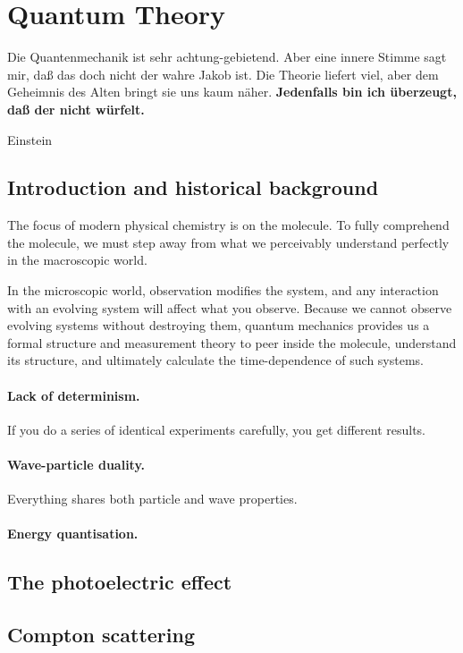 \documentclass{article}
\numberwithin{theorem}{section}
\numberwithin{corollary}{section}
\numberwithin{postulate}{section}
\numberwithin{lemma}{section}
\numberwithin{definition}{section}
\begin{document}
\newpage

\setcounter{section}{0}
\section{Quantum Theory}

\epigraph{Die Quantenmechanik ist sehr achtung-gebietend. Aber eine innere Stimme sagt mir, daß das doch nicht der wahre Jakob ist. Die Theorie liefert viel, aber dem Geheimnis des Alten bringt sie uns kaum näher. \textbf{Jedenfalls bin ich überzeugt, daß der nicht würfelt.}}{Einstein}

\subsection{Introduction and historical background}
The focus of modern physical chemistry is on the molecule. To fully comprehend the molecule, we must step away from what we perceivably understand perfectly in the macroscopic world.

In the microscopic world, observation modifies the system, and any interaction with an evolving system will affect what you observe. Because we cannot observe evolving systems without destroying them, quantum mechanics provides us a formal structure and measurement theory to peer inside the molecule, understand its structure, and ultimately calculate the time-dependence of such systems.

\paragraph*{Lack of determinism.} If you do a series of identical experiments carefully, you get different results.

\paragraph{Wave-particle duality.}Everything shares both particle and wave properties.

\paragraph{Energy quantisation. }

\subsection{The photoelectric effect}

\subsection{Compton scattering}
\end{document}
